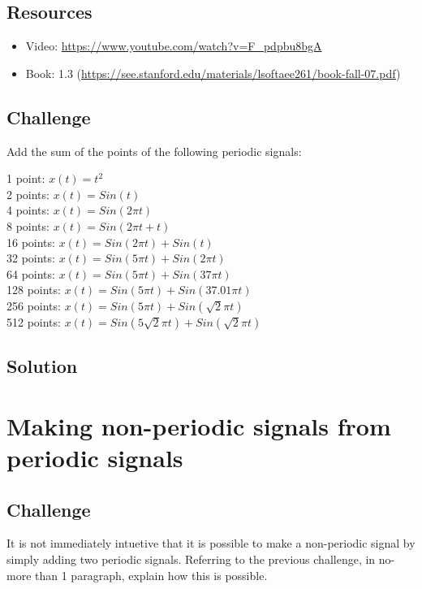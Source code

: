 \subsection*{Resources}
\begin{itemize}
    \item Video: \url{https://www.youtube.com/watch?v=F_pdpbu8bgA}
    \item Book: 1.3 (\url{https://see.stanford.edu/materials/lsoftaee261/book-fall-07.pdf})
\end{itemize}

\subsection*{Challenge}
Add the sum of the points of the following periodic signals:

1 point: $x(t) = t^2$\\
2 points: $x(t) = Sin(t)$\\
4 points: $x(t) = Sin(2 \pi t)$\\
8 points: $x(t) = Sin(2 \pi t + t)$\\
16 points: $x(t) = Sin(2 \pi t) + Sin(t)$\\
32 points: $x(t) = Sin(5 \pi t) + Sin(2 \pi t)$\\
64 points: $x(t) = Sin(5 \pi t) + Sin(37 \pi t)$\\
128 points: $x(t) = Sin(5 \pi t) + Sin(37.01 \pi t)$\\
256 points: $x(t) = Sin(5 \pi t) + Sin(\sqrt{2} \pi t)$\\
512 points: $x(t) = Sin(5 \sqrt{2} \pi t) + Sin(\sqrt{2} \pi t)$

\subsection*{Solution}




\newpage
\section{Making non-periodic signals from periodic signals}

\subsection*{Challenge}
It is not immediately intuetive that it is possible to make a non-periodic signal by simply adding two periodic signals. Referring to the previous challenge, in no-more than 1 paragraph, explain how this is possible.

